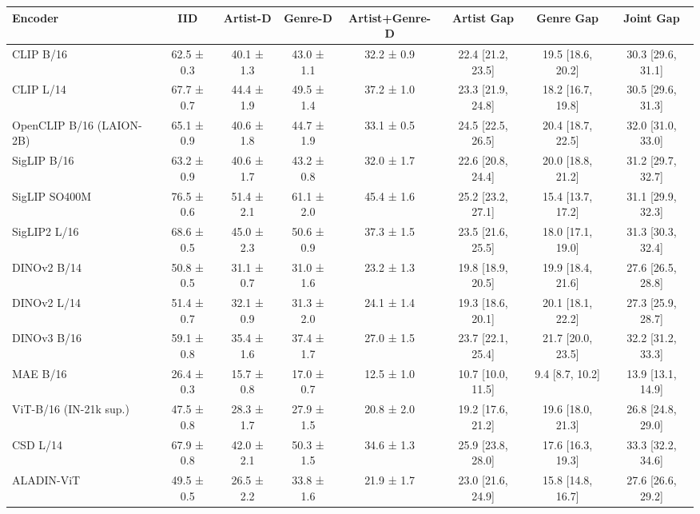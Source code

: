 \begin{tabular}{lccccccc}
\toprule
Encoder & IID & Artist-D & Genre-D & Artist+Genre-D & Artist Gap & Genre Gap & Joint Gap \\
\midrule
CLIP B/16 & 62.5 ± 0.3 & 40.1 ± 1.3 & 43.0 ± 1.1 & 32.2 ± 0.9 & 22.4 [21.2, 23.5] & 19.5 [18.6, 20.2] & 30.3 [29.6, 31.1] \\
CLIP L/14 & 67.7 ± 0.7 & 44.4 ± 1.9 & 49.5 ± 1.4 & 37.2 ± 1.0 & 23.3 [21.9, 24.8] & 18.2 [16.7, 19.8] & 30.5 [29.6, 31.3] \\
OpenCLIP B/16 (LAION-2B) & 65.1 ± 0.9 & 40.6 ± 1.8 & 44.7 ± 1.9 & 33.1 ± 0.5 & 24.5 [22.5, 26.5] & 20.4 [18.7, 22.5] & 32.0 [31.0, 33.0] \\
SigLIP B/16 & 63.2 ± 0.9 & 40.6 ± 1.7 & 43.2 ± 0.8 & 32.0 ± 1.7 & 22.6 [20.8, 24.4] & 20.0 [18.8, 21.2] & 31.2 [29.7, 32.7] \\
SigLIP SO400M & 76.5 ± 0.6 & 51.4 ± 2.1 & 61.1 ± 2.0 & 45.4 ± 1.6 & 25.2 [23.2, 27.1] & 15.4 [13.7, 17.2] & 31.1 [29.9, 32.3] \\
SigLIP2 L/16 & 68.6 ± 0.5 & 45.0 ± 2.3 & 50.6 ± 0.9 & 37.3 ± 1.5 & 23.5 [21.6, 25.5] & 18.0 [17.1, 19.0] & 31.3 [30.3, 32.4] \\
DINOv2 B/14 & 50.8 ± 0.5 & 31.1 ± 0.7 & 31.0 ± 1.6 & 23.2 ± 1.3 & 19.8 [18.9, 20.5] & 19.9 [18.4, 21.6] & 27.6 [26.5, 28.8] \\
DINOv2 L/14 & 51.4 ± 0.7 & 32.1 ± 0.9 & 31.3 ± 2.0 & 24.1 ± 1.4 & 19.3 [18.6, 20.1] & 20.1 [18.1, 22.2] & 27.3 [25.9, 28.7] \\
DINOv3 B/16 & 59.1 ± 0.8 & 35.4 ± 1.6 & 37.4 ± 1.7 & 27.0 ± 1.5 & 23.7 [22.1, 25.4] & 21.7 [20.0, 23.5] & 32.2 [31.2, 33.3] \\
MAE B/16 & 26.4 ± 0.3 & 15.7 ± 0.8 & 17.0 ± 0.7 & 12.5 ± 1.0 & 10.7 [10.0, 11.5] & 9.4 [8.7, 10.2] & 13.9 [13.1, 14.9] \\
ViT-B/16 (IN-21k sup.) & 47.5 ± 0.8 & 28.3 ± 1.7 & 27.9 ± 1.5 & 20.8 ± 2.0 & 19.2 [17.6, 21.2] & 19.6 [18.0, 21.3] & 26.8 [24.8, 29.0] \\
CSD L/14 & 67.9 ± 0.8 & 42.0 ± 2.1 & 50.3 ± 1.5 & 34.6 ± 1.3 & 25.9 [23.8, 28.0] & 17.6 [16.3, 19.3] & 33.3 [32.2, 34.6] \\
ALADIN-ViT & 49.5 ± 0.5 & 26.5 ± 2.2 & 33.8 ± 1.6 & 21.9 ± 1.7 & 23.0 [21.6, 24.9] & 15.8 [14.8, 16.7] & 27.6 [26.6, 29.2] \\
\bottomrule
\end{tabular}
